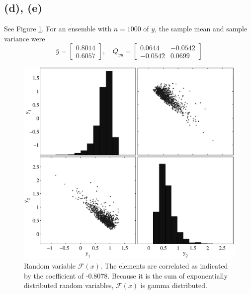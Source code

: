\documentclass[fleqn, letterpaper]{tufte-handout}
\begin{document}
\subsection{(d), (e)}
See Figure \ref{lognorm}. 
For an ensemble with $n=1000$ of $y$, the sample mean and sample variance were
\[
\bar{y}=\begin{bmatrix} 0.8014 \\ 0.6057 \end{bmatrix},
\quad Q_{yy} = \begin{bmatrix} 0.0644 & -0.0542 \\ -0.0542 & 0.0699 \end{bmatrix}
\]

\begin{figure}
        \includegraphics[width=\textwidth]{problem2e}
        \caption{Random variable $\mathcal{F}(x)$.
        The elements are correlated as indicated by the coefficient of -0.8078. Because it is the sum of exponentially distributed random variables, $\mathcal{F}(x)$ is gamma distributed.}
        \label{lognorm}
\end{figure}
\end{document}
